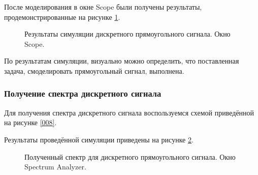\documentclass[a4paper,14pt]{extarticle}
\begin{document}
После моделирования в окне Scope были получены результаты, 
продемонстрированные на рисунке \ref{010}.

\begin{figure}[H]
\caption{Результаты симуляции дискретного прямоугольного сигнала. 
Окно Scope.}
\label{010}
\end{figure}

По результатам симуляции, визуально можно определить, что 
поставленная задача, смоделировать прямоугольный сигнал, 
выполнена.

\subsubsection{Получение спектра дискретного сигнала}

Для получения спектра дискретного сигнала воспользуемся схемой 
приведённой на рисунке \ref{008}.

Результаты проведённой симуляции приведены на рисунке \ref{011}.

\begin{figure}[H]
\caption{Полученный спектр для дискретного прямоугольного 
сигнала. Окно Spectrum Analyzer.}
\label{011}
\end{figure}
\end{document}
